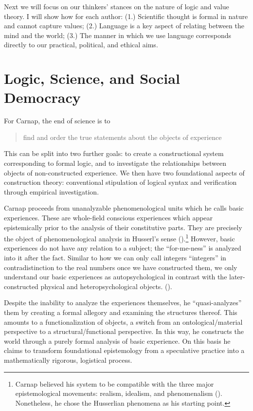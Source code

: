 \documentclass[leqno, 12pt]{turabian-researchpaper}
\begin{document}
	Next we will focus on our thinkers' stances on the nature of logic and value
	theory. I will show how for each author: (1.) Scientific thought is formal in
	nature and cannot capture values; (2.) Language is a key aspect of relating between
	the mind and the world; (3.) The manner in which we use language corresponds
	directly to our practical, political, and ethical aims.

	\section{Logic, Science, and Social Democracy}

	For Carnap, the end of science is to \blockquote[{}]{find and order the true statements about the objects of experience}.
	This can be split into two further goals: to create a constructional system
	corresponding to formal logic, and to investigate the relationships between objects
	of non-constructed experience. We then have two foundational aspects of
	construction theory: conventional stipulation of logical syntax and verification
	through empirical investigation.

	Carnap proceeds from unanalyzable phenomenological units which he calls basic experiences.
	These are whole-field conscious experiences which appear epistemically prior
	to the analysis of their constitutive parts. They are precisely the object of phenomenological
	analysis in Husserl's sense ().\footnote{Carnap
	believed his system to be compatible with the three major epistemological
	movements: realism, idealism, and phenomenalism ().
	Nonetheless, he chose the Husserlian phenomena as his starting point.} However,
	basic experiences do not have any relation to a subject; the \enquote{for-me-ness}
	is analyzed into it after the fact. Similar to how we can only call integers
	\enquote{integers} in contradistinction to the real numbers once we have constructed
	them, we only understand our basic experiences as autopsychological in
	contrast with the later-constructed physical and heteropsychological objects. ().

	Despite the inability to analyze the experiences themselves, he \enquote{quasi-analyzes}
	them by creating a formal allegory and examining the structures thereof. This
	amounts to a functionalization of objects, a switch from an ontological/material
	perspective to a structural/functional perspective. In this way, he constructs
	the world through a purely formal analysis of basic experience. On this basis
	he claims to transform foundational epistemology from a speculative practice
	into a mathematically rigorous, logistical process.
\end{document}
